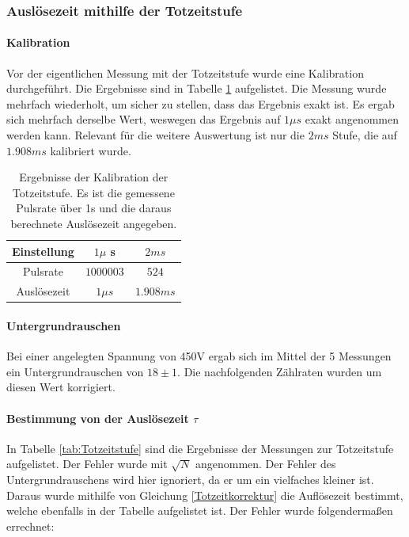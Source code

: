 \documentclass[12pt,a4paper]{article}
\begin{document}
\subsubsection{Auslösezeit mithilfe der Totzeitstufe}


\paragraph{Kalibration}
Vor der eigentlichen Messung mit der Totzeitstufe wurde eine Kalibration durchgeführt. Die Ergebnisse sind in Tabelle \ref{tab:Totzeitkalibration} aufgelistet. Die Messung wurde mehrfach wiederholt, um sicher zu stellen, dass das Ergebnis exakt ist. Es ergab sich mehrfach derselbe Wert, weswegen das Ergebnis auf $1\mu s$ exakt angenommen werden kann. Relevant für die weitere Auswertung ist nur die $2ms$ Stufe, die auf $1.908ms$ kalibriert wurde.

\begin{table}[H]
\centering
\begin{tabular}{|c|c||c|}
\hline
Einstellung & $1\mu$ s & $2ms$\\
\hline 
Pulsrate & $1000003$ & $524$ \\
\hline 
Auslösezeit & $1\mu s$ & $1.908ms$ \\
\hline
\end{tabular}
\caption{Ergebnisse der Kalibration der Totzeitstufe. Es ist die gemessene Pulsrate über 1s und die daraus berechnete Auslösezeit angegeben.}
\label{tab:Totzeitkalibration}
\end{table}

\paragraph{Untergrundrauschen}
Bei einer angelegten Spannung von 450V ergab sich im Mittel der 5 Messungen ein Untergrundrauschen von $18\pm 1$. Die nachfolgenden Zählraten wurden um diesen Wert korrigiert.

\paragraph{Bestimmung von der Auslösezeit $\tau$}
In Tabelle \ref{tab:Totzeitstufe} sind die Ergebnisse der Messungen zur Totzeitstufe aufgelistet. Der Fehler wurde mit $\sqrt{N}$ angenommen. Der Fehler des Untergrundrauschens wird hier ignoriert, da er um ein vielfaches kleiner ist.\\
Daraus wurde mithilfe von Gleichung \ref{Totzeitkorrektur} die Auflösezeit bestimmt, welche ebenfalls in der Tabelle aufgelistet ist. Der Fehler wurde folgendermaßen errechnet:
\end{document}
